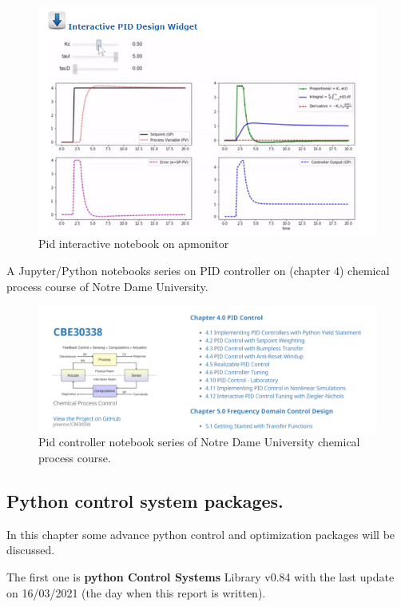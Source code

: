 \begin{figure}[H]
	\centering
	\includegraphics[width=0.8\columnwidth]{Pictures/PID_interactive.png}
	\caption[Short title]{Pid interactive notebook on apmonitor}
	\label{figure:interactive notebook}
\end{figure}

\newpage

A Jupyter/Python notebooks series on PID controller on (chapter 4) chemical process course of Notre Dame University\cite{CBE}.

\begin{figure}[H]
	\centering
	\includegraphics[width=0.8\columnwidth]{Pictures/PID_NotreDame.png}
	\caption[Short title]{Pid controller notebook series of Notre Dame University chemical process course.}
	\label{figure:NotreDame notebook}
\end{figure}

\subsection{Python control system packages.}

In this chapter some advance python control and optimization packages will be discussed.

The first one is \textbf{python Control Systems} Library v0.84 \cite{Control_Lib} \cite{GitControl_Lib} with the last update on 16/03/2021 (the day when this report is written).

